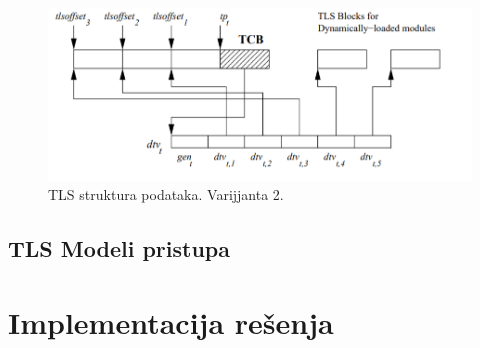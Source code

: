 \documentclass[12pt,oneside]{memoir}
\begin{document}
\begin{figure}[h!]
	\begin{center}
		\includegraphics[scale=0.6]{slike/TLSmodelV2.png}
	\end{center}
	\caption{TLS struktura podataka. Varijjanta 2.}
	\label{fig:tls_prheader}
\end{figure}

\section{TLS Modeli pristupa}

\chapter{Implementacija rešenja}
\label{chp:Implementacija}
\end{document}
